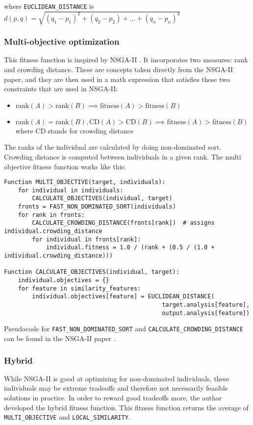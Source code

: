 where \texttt{EUCLIDEAN\_DISTANCE} is $d(p,q)=\sqrt{(q_1-p_1)^2+(q_2-p_2)+...+(q_n-p_n)^2}$

\subsubsection{Multi-objective optimization}
This fitness function is inspired by NSGA-II \citep{nsga2}. It incorporates two measures: rank and crowding distance. These are concepts taken directly from the NSGA-II paper, and they are then used in a math expression that satisfies these two constraints that are used in NSGA-II:

\begin{itemize}
\item $\text{rank}(A) > \text{rank}(B) \implies \text{fitness}(A) > \text{fitness}(B)$
\item $\text{rank}(A) = \text{rank}(B), \text{CD}(A) > \text{CD}(B) \implies \text{fitness}(A) > \text{fitness}(B)$
\\ where CD stands for crowding distance
\end{itemize}

The ranks of the individual are calculated by doing non-dominated sort. Crowding distance is computed between individuals in a given rank. The multi objective fitness function works like this:

\begin{Verbatim}[fontsize=\small]
Function MULTI_OBJECTIVE(target, individuals):
    for individual in individuals:
        CALCULATE_OBJECTIVES(individual, target)
    fronts = FAST_NON_DOMINATED_SORT(individuals)
    for rank in fronts:
        CALCULATE_CROWDING_DISTANCE(fronts[rank])  # assigns individual.crowding_distance
        for individual in fronts[rank]:
            individual.fitness = 1.0 / (rank + (0.5 / (1.0 + individual.crowding_distance)))

Function CALCULATE_OBJECTIVES(individual, target):
    individual.objectives = {}
    for feature in similarity_features:
        individual.objectives[feature] = EUCLIDEAN_DISTANCE(
                                             target.analysis[feature],
                                             output.analysis[feature])
\end{Verbatim}

Pseudocode for \texttt{FAST\_NON\_DOMINATED\_SORT} and \texttt{CALCULATE\_CROWDING\_DISTANCE} can be found in the NSGA-II paper \citep{nsga2}.

\subsubsection{Hybrid}
While NSGA-II is good at optimizing for non-dominated individuals, these individuals may be extreme tradeoffs and therefore not necessarily feasible solutions in practice. In order to reward good tradeoffs more, the author developed the hybrid fitness function. This fitness function returns the average of \texttt{MULTI\_OBJECTIVE} and \texttt{LOCAL\_SIMILARITY}.

